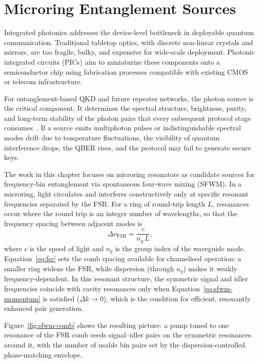 \section{Microring Entanglement Sources}
\label{sec:qsrc-microring}

Integrated photonics addresses the device-level bottleneck in deployable quantum
communication. Traditional tabletop optics, with discrete non-linear crystals and
mirrors, are too fragile, bulky, and expensive for wide-scale deployment. Photonic
integrated circuits (PICs) aim to miniaturize these components onto a semiconductor
chip using fabrication processes compatible with existing CMOS or telecom infrastructure.

For entanglement-based QKD and future repeater networks, the photon source is the critical component. It determines
the spectral structure, brightness, purity, and long-term stability of the photon pairs
that every subsequent protocol stage consumes~\cite{Wehner2018}. If a source emits
multiphoton pulses or indistinguishable spectral modes drift due to temperature fluctuations,
the visibility of quantum interference drops, the QBER rises,
and the protocol may fail to generate secure keys.

The work in this chapter focuses on microring resonators as candidate sources for
frequency-bin entanglement via spontaneous four-wave mixing (SFWM). In a microring,
light circulates and interferes constructively only at specific resonant frequencies
separated by the FSR. For a ring of round-trip length $L$, resonances occur
where the round trip is an integer number of wavelengths, so that the frequency
spacing between adjacent modes is
\begin{equation}
  \Delta\nu_\mathrm{FSR} = \frac{c}{n_g\,L},
  \label{eq:fsr}
\end{equation}
where $c$ is the speed of light and $n_g$ is the group index of the waveguide
mode. Equation~\eqref{eq:fsr} sets the comb spacing available for channelised
operation: a smaller ring widens the FSR, while dispersion (through $n_g$) makes
it weakly frequency-dependent. In this resonant structure, the symmetric signal and idler frequencies coincide with cavity resonances only when Equation~\eqref{eq:sfwm-momentum} is satisfied ($\Delta k \to 0$), which is the condition for efficient, resonantly enhanced pair generation.

Figure~\ref{fig:sfwm-comb} shows the resulting picture: a pump tuned to one resonance of the FSR comb seeds signal--idler pairs on the symmetric resonances around it, with the number of usable bin pairs set by the dispersion-controlled phase-matching envelope.

